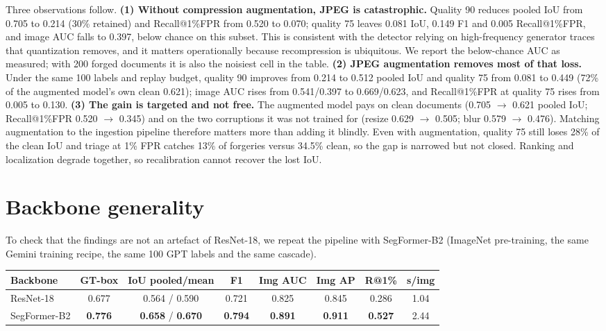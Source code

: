 \documentclass[preprint,12pt]{elsarticle}
\begin{document}
Three observations follow. \textbf{(1) Without compression augmentation, JPEG is catastrophic.} Quality 90 reduces pooled IoU from 0.705 to 0.214 (30\% retained) and Recall@1\%FPR from 0.520 to 0.070; quality 75 leaves 0.081 IoU, 0.149 F1 and 0.005 Recall@1\%FPR, and image AUC falls to 0.397, below chance on this subset. This is consistent with the detector relying on high-frequency generator traces that quantization removes, and it matters operationally because recompression is ubiquitous. We report the below-chance AUC as measured; with 200 forged documents it is also the noisiest cell in the table. \textbf{(2) JPEG augmentation removes most of that loss.} Under the same 100 labels and replay budget, quality 90 improves from 0.214 to 0.512 pooled IoU and quality 75 from 0.081 to 0.449 (72\% of the augmented model's own clean 0.621); image AUC rises from 0.541/0.397 to 0.669/0.623, and Recall@1\%FPR at quality 75 rises from 0.005 to 0.130. \textbf{(3) The gain is targeted and not free.} The augmented model pays on clean documents (0.705 $\rightarrow$ 0.621 pooled IoU; Recall@1\%FPR 0.520 $\rightarrow$ 0.345) and on the two corruptions it was not trained for (resize 0.629 $\rightarrow$ 0.505; blur 0.579 $\rightarrow$ 0.476). Matching augmentation to the ingestion pipeline therefore matters more than adding it blindly. Even with augmentation, quality 75 still loses 28\% of the clean IoU and triage at 1\% FPR catches 13\% of forgeries versus 34.5\% clean, so the gap is narrowed but not closed. Ranking and localization degrade together, so recalibration cannot recover the lost IoU.

\bigskip


\section{Backbone generality}
To check that the findings are not an artefact of ResNet-18, we repeat the pipeline with SegFormer-B2 (ImageNet pre-training, the same Gemini training recipe, the same 100 GPT labels and the same cascade).

\begin{table}[H]\centering\small
\begin{tabular}{lccccccc}
\toprule
Backbone & GT-box & IoU pooled/mean & F1 & Img AUC & Img AP & R@1\% & s/img \\
\midrule
ResNet-18 & 0.677 & 0.564 / 0.590 & 0.721 & 0.825 & 0.845 & 0.286 & 1.04 \\
SegFormer-B2 & \textbf{0.776} & \textbf{0.658} / \textbf{0.670} & \textbf{0.794} & \textbf{0.891} & \textbf{0.911} & \textbf{0.527} & 2.44 \\
\bottomrule
\end{tabular}
\end{table}
\end{document}
